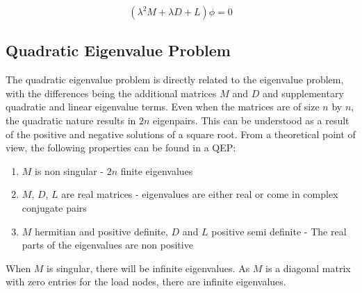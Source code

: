 \[(\lambda^2M+\lambda D+L)\phi=0\]
\subsection*{Quadratic Eigenvalue Problem}
The quadratic eigenvalue problem is directly related to the eigenvalue problem,
with the differences being the additional matrices $M$ and $D$ and supplementary
quadratic and linear eigenvalue terms. Even when the matrices are of size $n$ by $n$, the
quadratic nature results in $2n$ eigenpairs. This can be understood as a result of the
positive and negative solutions of a square root. From a theoretical point of view,
the following properties can be found in a QEP:
\begin{enumerate}
\item  $M$ is non singular - $2n$ finite eigenvalues
\item $M$, $D$, $L$ are real matrices - eigenvalues are either real or come in complex conjugate
pairs
\item $M$ hermitian and positive definite, $D$ and $L$ positive semi definite - The real
parts of the eigenvalues are non positive
\end{enumerate}
When $M$ is singular, there will be infinite eigenvalues. As $M$ is a diagonal matrix
with zero entries for the load nodes, there are infinite eigenvalues. 